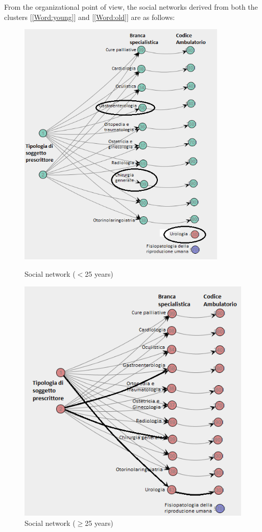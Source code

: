 From the organizational point of view, the social networks derived from both the clusters [\ref{Word:young}] and [\ref{Word:old}] are as follows:
\begin{figure} [htbp]
\begin{minipage}[t]{0.5\textwidth}
\includegraphics[width=0.89\textwidth]{AmbulatoriSocialNetworkYoungs}
\caption{Social network ($<$25 years)}
\end{minipage}
\begin{minipage}[t]{0.5\textwidth}
\includegraphics[width=\textwidth]{AmbulatoriSocialNetworkOlds}
\caption{Social network ($\geq$25 years)}
\end{minipage}
\end{figure}\\
